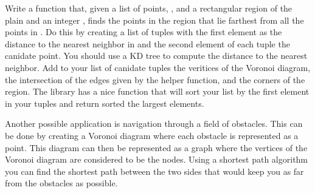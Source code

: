 \begin{problem}
\label{FurthestPoints}
Write a function that, given a list of points, , and a rectangular region of the plain and an integer , finds the  points in the region that lie farthest from all the points in .
Do this by creating a list of tuples with the first element as the distance to the nearest neighbor in  and the second element of each tuple the canidate point.
You should use a KD tree to compute the distance to the nearest neighbor.
Add to your list of canidate tuples the veritices of the Voronoi diagram, the intersection of the edges given by the helper function, and the corners of the region.
The library  has a nice function  that will sort your list  by the first element in your tuples and return sorted the largest  elements.
\end{problem}

Another possible application is navigation through a field of obstacles.
This can be done by creating a Voronoi diagram where each obstacle is represented as a point.
This diagram can then be represented as a graph where the vertices of the Voronoi diagram are considered to be the nodes.
Using a shortest path algorithm you can find the shortest path between the two sides that would keep you as far from the obstacles as possible.

